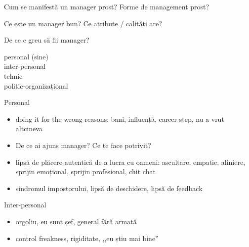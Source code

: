 \documentclass{simple}
\begin{document}
\begin{frame}{}
  \begin{center}
    Cum se manifestă un manager prost? Forme de management prost?
  \end{center}
\end{frame}

\begin{frame}{}
  \begin{center}
    Ce este un manager bun? Ce atribute / calități are?
  \end{center}
\end{frame}

\begin{frame}{De ce e greu să fii manager?}
  \begin{center}
    \pause
    personal (sine) \\
    \vspace{1cm}
    \pause
    inter-personal \\
    \vspace{1cm}
    \pause
    tehnic \\
    \vspace{1cm}
    \pause
    politic-organizațional
  \end{center}
\end{frame}

\begin{frame}{Personal}
  \begin{itemize}
    \pause
    \item doing it for the wrong reasons: bani, influență, career step, nu a vrut altcineva
    \pause
    \item De ce ai ajuns manager? Ce te face potrivit?
    \pause
    \item lipsă de plăcere autentică de a lucra cu oameni: ascultare, empatie, aliniere, sprijin emoțional, sprijin profesional, chit chat
    \pause
    \item sindromul impostorului, lipsă de deschidere, lipsă de feedback
  \end{itemize}
\end{frame}

\begin{frame}{Inter-personal}
  \begin{itemize}
    \pause
    \item orgoliu, eu sunt șef, general fără armată
    \pause
    \item control freakness, rigiditate, ,,eu știu mai bine''
  \end{itemize}
\end{frame}
\end{document}
